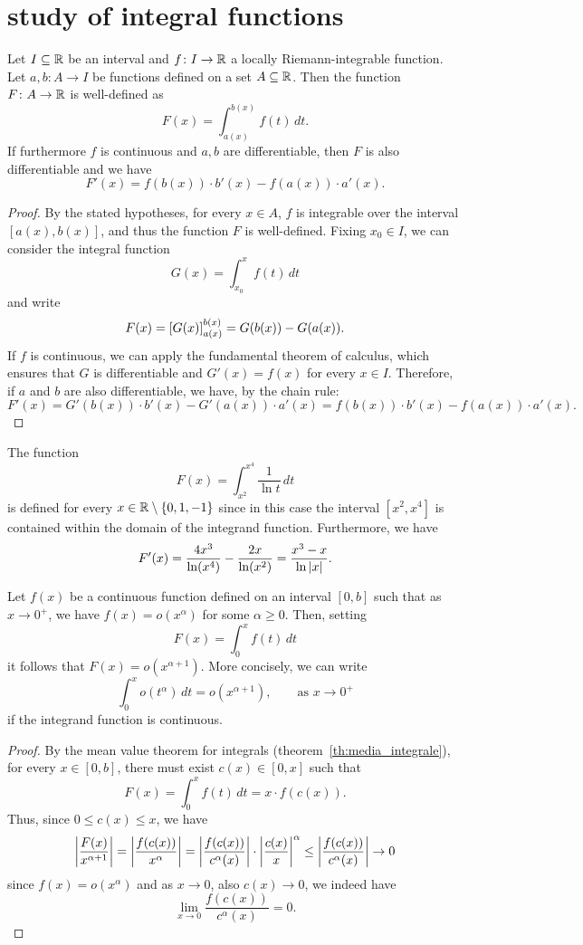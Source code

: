 \section{study of integral functions}

\begin{theorem}
Let $I\subseteq {\mathbb R}$ be an interval and $f\colon I \to {\mathbb R}$ a locally
Riemann-integrable function. Let $a,b\colon A \to I$ be functions defined on a
set $A \subseteq {\mathbb R}$. Then the function $F\colon A \to {\mathbb R}$ is well-defined as
\[
  F(x) = \int_{a(x)}^{b(x)} f(t)\, dt.
\]
If furthermore $f$ is continuous and $a,b$ are differentiable, then $F$ is also
differentiable and we have
\[
  F'(x) = f(b(x)) \cdot b'(x) - f(a(x)) \cdot a'(x).
\]
\end{theorem}
%
\begin{proof}
By the stated hypotheses, for every $x\in A$, $f$ is integrable over the
interval $[a(x),b(x)]$, and thus the function $F$ is well-defined. Fixing
$x_0\in I$, we can consider the integral function
\[
  G(x) = \int_{x_0}^x f(t)\, dt
\]
and write
\[
  F(x)
    = {\left[ G(x) \right]}_{a(x)}^{b(x)}
    = G(b(x)) - G(a(x)).
\]
If $f$ is continuous, we can apply the fundamental theorem of calculus, which
ensures that $G$ is differentiable and $G'(x) = f(x)$ for every $x\in I$.
Therefore, if $a$ and $b$ are also differentiable, we have, by the chain rule:
\[
F'(x)
= G'(b(x)) \cdot b'(x) - G'(a(x)) \cdot a'(x)
= f(b(x)) \cdot b'(x) - f(a(x)) \cdot a'(x).
\]
\end{proof}

\begin{example}
The function
\[
 F(x) = \int_{x^2}^{x^4} \frac{1}{\ln t}\, dt
\]
is defined for every $x\in {\mathbb R}\setminus{\left\{ 0,1,-1 \right\}}$ since in this case the
interval $[x^2,x^4]$ is contained within the domain of the integrand function.
Furthermore, we have
\[
F'(x)
= \frac{4x^3}{\ln (x^4)} - \frac{2x}{\ln (x^2)}
= \frac{x^3-x}{\ln {\left|x\right|}}.
\]
\end{example}

\begin{theorem}
Let $f(x)$ be a continuous function defined on an interval $[0,b]$ such that as
$x\to 0^+$, we have $f(x) = o(x^\alpha)$ for some $\alpha\ge 0$. Then, setting
\[
  F(x) = \int_0^x f(t)\, dt
\]
it follows that $F(x) = o(x^{\alpha+1})$. More concisely, we can write
\[
  \int_0^x o(t^\alpha)\, dt = o (x^{\alpha+1}),
  \qquad \text{as $x\to 0^+$}
\]
if the integrand function is continuous.
\end{theorem}
%
\begin{proof}
By the mean value theorem for integrals (theorem~\ref{th:media_integrale}), for
every $x\in [0,b]$, there must exist $c(x)\in[0,x]$ such that
\[
  F(x)
  = \int_0^x f(t)\, dt
  = x \cdot f(c(x)).
\]
Thus, since $0\le c(x)\le x$, we have
\[
{\left|\frac{F(x)}{x^{\alpha+1}}\right|}
= {\left|\frac{f(c(x))}{x^\alpha}\right|}
= {\left|\frac{f(c(x))}{c^\alpha(x)}\right|}
\cdot {\left|\frac{c(x)}{x}\right|}^\alpha
\le {\left|\frac{f(c(x))}{c^\alpha(x)}\right|} \to 0
\]
since $f(x) = o(x^\alpha)$ and as $x\to 0$, also $c(x)\to 0$, we indeed have
\[
  \lim_{x\to 0} \frac{f(c(x))}{c^\alpha(x)} = 0.
\]
\end{proof}

